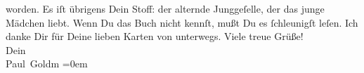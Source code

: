 \begin{ledgroupsized}[t]{13cm}
               worden. {\pb}Es iſt übrigens Dein Stoff: der alternde
               Junggeſelle, der das junge Mädchen  liebt. Wenn
               Du das Buch nicht kennſt, mußt
               Du es ſchleunigſt leſen.\pend
           \pstart
           Ich danke Dir für Deine lieben Karten \strikeout{\textcolor{gray}{aus}} von unterwegs.\pend
           \pstart
           Viele treue Grüße!{\\[\baselineskip]}Dein{\\[\baselineskip]}\spacefill\mbox{Paul Goldm}\pend
           \leftskip=0em{}
         
         \endnumbering{}\end{ledgroupsized}  \newcommand{\dateiname}{L03213}\newcommand{\titel}{Paul Goldmann an Arthur Schnitzler, 14. 7. [1902]}\newcommand{\editorInnen}{Martin Anton Müller und Laura Untner}
      